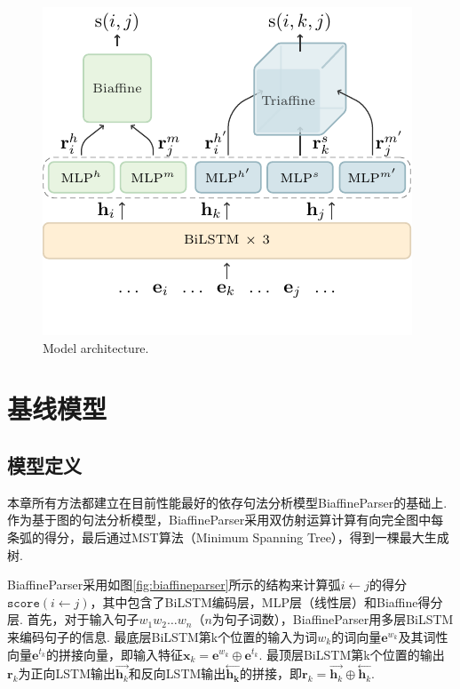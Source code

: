 \begin{figure}[tb]
    \centering
    \includegraphics [scale=0.8] {figures/framework.pdf}
    \caption{Model architecture.
    }
    \label{fig:framework}
\end{figure}

\section{基线模型}

\subsection{模型定义}
本章所有方法都建立在目前性能最好的依存句法分析模型BiaffineParser\cite{dozat2017deep}的基础上.
作为基于图的句法分析模型，BiaffineParser采用双仿射运算计算有向完全图中每条弧的得分，最后通过MST算法（Minimum Spanning Tree），得到一棵最大生成树.

BiaffineParser采用如图\ref{fig:biaffineparser}所示的结构来计算弧$i \leftarrow j$的得分$\texttt{score}\left( i \leftarrow j \right)$，其中包含了BiLSTM编码层，MLP层（线性层）和Biaffine得分层.
首先，对于输入句子$w_1w_2\dots w_n$（$n$为句子词数），BiaffineParser用多层BiLSTM来编码句子的信息.
最底层BiLSTM第k个位置的输入为词$w_k$的词向量$\mathbf{e}^{w_k}$及其词性向量$\mathbf{e}^{t_k}$的拼接向量，即输入特征$\mathbf{x}_k=\mathbf{e}^{w_k} \oplus \mathbf{e}^{t_k}$. %
最顶层BiLSTM第k个位置的输出$\mathbf{r}_k$为正向LSTM输出$\stackrel{\rightarrow}{\mathbf{h}_k}$和反向LSTM输出$\stackrel{\leftarrow}{\mathbf{h_k}}$的拼接，即$\mathbf{r}_k=\stackrel{\rightarrow}{\mathbf{h}_k} \oplus \stackrel{\leftarrow}{\mathbf{h}_k}$.

